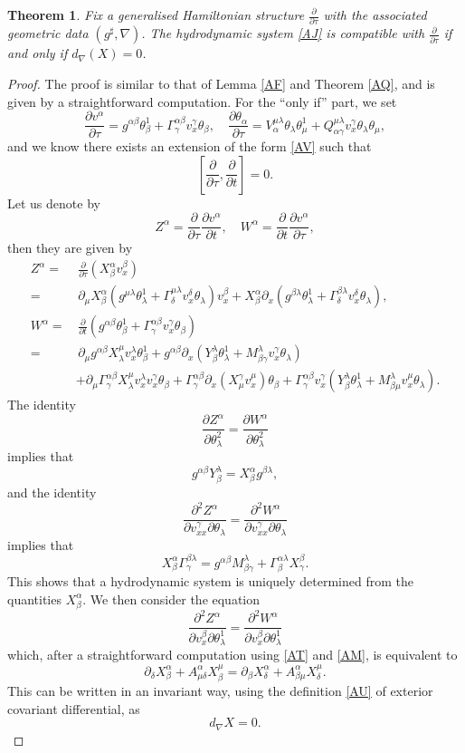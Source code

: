 \documentclass[11pt,a4paper]{amsart}
\numberwithin{equation}{section}
\newtheorem{theorem}{Theorem}[section]
\newcommand{\diff}[2]{\frac{\partial #1}{\partial #2}}
\newcommand{\qa}{\alpha}
\newcommand{\qb}{\beta}
\newcommand{\qd}{\delta}
\newcommand{\qg}{\gamma}
\newcommand{\qt}{\tau}
\newcommand{\qth}{\theta}
\newcommand{\qp}{\partial}
\newcommand{\Qg}{\Gamma}
\newcommand{\ql}{\lambda}
\newcommand{\kk}[1]{\left(#1\right)}
\newcommand{\fk}[2]{\left[#1, #2\right]}
\numberwithin{equation}{section}
\begin{document}
\begin{theorem}
  \label{AY}
  Fix a generalised Hamiltonian structure $\diff{}{\qt}$ with the associated geometric data $(g^\sharp,\nabla)$. The hydrodynamic system \eqref{AJ} is compatible with $\diff{}{\qt}$ if and only if $d_\nabla(X) = 0$. 
\end{theorem}
\begin{proof}
  The proof is similar to that of Lemma \ref{AF} and Theorem \ref{AQ}, and is given by a straightforward computation. For the ``only if'' part, we set 
  \[
\diff{v^\qa}{\qt} = g^{\qa\qb}\qth_\qb^1+\Qg^{\qa\qb}_\qg v^\qg_x\qth_\qb,\quad \diff{\qth_\qa}{\qt} = V_\qa^{\mu\ql}\qth_\ql\qth_\mu^1+Q^{\mu\ql}_{\qa\qg}v^\qg_x\qth_\ql\qth_\mu,
\]
and we know there exists an extension of the form \eqref{AV}
such that 
\[
\fk{\diff{}{\qt}}{\diff{}{t}} = 0.
\]
Let us denote by 
\[
Z^\qa = \diff{}{\qt}\diff{v^\qa}{t},\quad W^\qa = \diff{}{t}\diff{v^\qa}{\qt},
\]
then they are given by 
\begin{align*}
    Z^\qa =&\,\diff{}{\qt}\kk{X^\qa_\qb v^\qb_x}\\
    =&\,\qp_\mu X^\qa_\qb\kk{g^{\mu\ql}\qth_\ql^1+\Qg^{\mu\ql}_\qd v^\qd_x\qth_\ql}v^\qb_x+X^\qa_\qb\qp_x\kk{g^{\qb\ql}\qth_\ql^1+\Qg^{\qb\ql}_\qd v^\qd_x\qth_\ql},\\
    W^\qa =&\, \diff{}{t}\kk{g^{\qa\qb}\qth_\qb^1+\Qg^{\qa\qb}_\qg v^\qg_x\qth_\qb}\\
    =&\,\qp_\mu g^{\qa\qb}X^\mu_\ql v^\ql_x\qth_\qb^1+g^{\qa\qb}\qp_x\kk{Y^\ql_\qb\qth_\ql^1+M^\ql_{\qb\qg}v^\qg_x\qth_\ql}\\
    &+\qp_\mu\Qg^{\qa\qb}_\qg X^\mu_\ql v^\ql_x v^\qg_x\qth_\qb+\Qg^{\qa\qb}_\qg\qp_x\kk{X^\qg_\mu v^\mu_x}\qth_\qb+\Qg^{\qa\qb}_\qg v^\qg_x\kk{Y^\ql_\qb \qth_\ql^1+M^\ql_{\qb\mu}v^\mu_x\qth_\ql}.
\end{align*}
The identity 
\[
\diff{Z^\qa}{\qth_\ql^2} = \diff{W^\qa}{\qth_\ql^2}
\]
implies that 
\begin{equation}
  \label{AT}
g^{\qa\qb}Y^\ql_\qb = X^\qa_\qb g^{\qb\ql},
\end{equation}
and the identity 
\[
\frac{\qp^2 Z^\qa}{\qp v^\qg_{xx}\qp\qth_\ql} = \frac{\qp^2 W^\qa}{\qp v^\qg_{xx}\qp\qth_\ql}
\]
implies that 
\begin{equation}
  \label{BB}
X^\qa_\qb\Qg^{\qb\ql}_\qg = g^{\qa\qb}M^\ql_{\qb\qg}+\Qg^{\qa\ql}_{\qb}X^\qb_\qg.
\end{equation}
This shows that a hydrodynamic system is uniquely determined from the quantities $X^\qa_\qb$.
We then consider the equation 
\[
\frac{\qp^2 Z^\qa}{\qp v^\qb_x\qp \qth_\ql^1} = \frac{\qp^2 W^\qa}{\qp v^\qb_x\qp \qth_\ql^1}
\]
which, after a straightforward computation using \eqref{AT} and \eqref{AM}, is equivalent to 
\[
\qp_\qd X^\qa_\qb+ A^\qa_{\mu\qd} X^\mu_\qb = \qp_\qb X^\qa_\qd+A^\qa_{\qb\mu}X^\mu_\qd.
\]
This can be written in an invariant way, using the definition \eqref{AU} of exterior covariant differential, as 
\[
d_{\nabla} X = 0.
\]


\end{proof}
\end{document}
